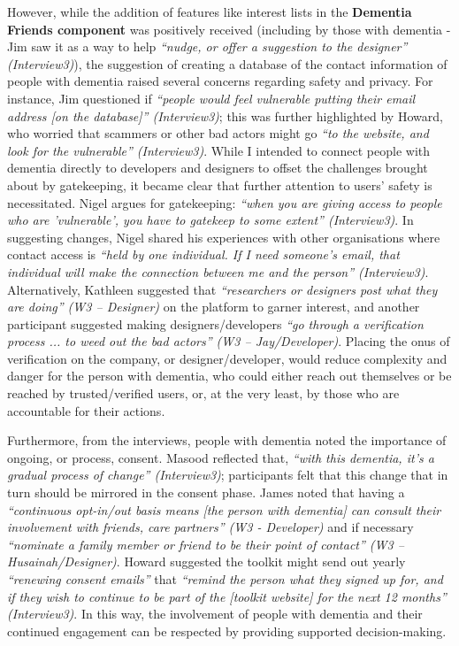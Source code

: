 However, while the addition of features like interest lists in the \textbf{Dementia Friends component} was positively received (including by those with dementia - Jim saw it as a way to help \textit{``nudge, or offer a suggestion to the designer'' (Interview3)}), the suggestion of creating a database of the contact information of people with dementia raised several concerns regarding safety and privacy. For instance, Jim questioned if \textit{``people would feel vulnerable putting their email address [on the database]'' (Interview3)}; this was further highlighted by Howard, who worried that scammers or other bad actors might go \textit{``to the website, and look for the vulnerable'' (Interview3)}. While I intended to connect people with dementia directly to developers and designers to offset the challenges brought about by gatekeeping, it became clear that further attention to users’ safety is necessitated. Nigel argues for gatekeeping: \textit{``when you are giving access to people who are 'vulnerable', you have to gatekeep to some extent'' (Interview3)}. In suggesting changes, Nigel shared his experiences with other organisations where contact access is \textit{``held by one individual. If I need someone's email, that individual will make the connection between me and the person'' (Interview3)}. Alternatively, Kathleen suggested that \textit{``researchers or designers post what they are doing'' (W3 – Designer)} on the platform to garner interest, and another participant suggested making designers/developers \textit{``go through a verification process ... to weed out the bad actors'' (W3 – Jay/Developer)}. Placing the onus of verification on the company, or designer/developer, would reduce complexity and danger for the person with dementia, who could either reach out themselves or be reached by trusted/verified users, or, at the very least, by those who are accountable for their actions. 

Furthermore, from the interviews, people with dementia noted the importance of ongoing, or process, consent. Masood reflected that, \textit{``with this dementia, it's a gradual process of change'' (Interview3)}; participants felt that this change that in turn should be mirrored in the consent phase. James noted that having a \textit{``continuous opt-in/out basis means [the person with dementia] can consult their involvement with friends, care partners'' (W3 - Developer)} and if necessary \textit{``nominate a family member or friend to be their point of contact'' (W3 – Husainah/Designer)}. Howard suggested the toolkit might send out yearly \textit{``renewing consent emails''} that \textit{``remind the person what they signed up for, and if they wish to continue to be part of the [toolkit website] for the next 12 months'' (Interview3)}. In this way, the involvement of people with dementia and their continued engagement can be respected by providing supported decision-making. 


